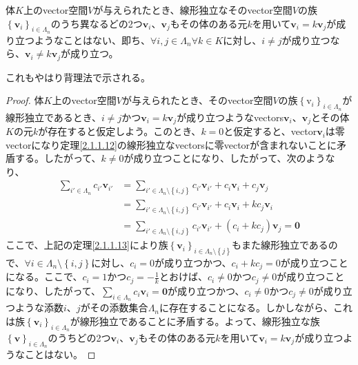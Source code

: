 \documentclass[dvipdfmx]{jsarticle}
\begin{document}
\begin{thm}\label{2.1.1.14}
体$K$上のvector空間$V$が与えられたとき、線形独立なそのvector空間$V$の族$\left\{ \mathbf{v}_i \right\}_{i\in \varLambda_n } $のうち異なるどの2つ$\mathbf{v}_{i}$、$\mathbf{v}_{j}$もその体のある元$k$を用いて$\mathbf{v}_{i} = k\mathbf{v}_{j}$が成り立つようなことはない、即ち、$\mathbf{\forall}i,j \in \varLambda_{n}\forall k \in K$に対し、$i \neq j$が成り立つなら、$\mathbf{v}_{i} \neq k\mathbf{v}_{j}$が成り立つ。
\end{thm}\par
これもやはり背理法で示される。
\begin{proof}
体$K$上のvector空間$V$が与えられたとき、そのvector空間$V$の族$\left\{ \mathrm{v}_i \right\}_{i\in \varLambda_n } $が線形独立であるとき、$i \neq j$かつ$\mathbf{v}_{i} = k\mathbf{v}_{j}$が成り立つようなvectors$\mathbf{v}_{i}$、$\mathbf{v}_{j}$とその体$K$の元$k$が存在すると仮定しよう。このとき、$k = 0$と仮定すると、vector$\mathbf{v}_{i}$は零vectorになり定理\ref{2.1.1.12}の線形独立なvectorsに零vectorが含まれないことに矛盾する。したがって、$k \neq 0$が成り立つことになり、したがって、次のようなり、
\begin{align*}
\sum_{i' \in \varLambda_{n}} {c_{i'}\mathbf{v}_{i'}} &= \sum_{i' \in \varLambda_{n} \setminus \left\{ i,j \right\}} {c_{i'}\mathbf{v}_{i'}} + c_{i}\mathbf{v}_{i} + c_{j}\mathbf{v}_{j}\\
&= \sum_{i' \in \varLambda_{n} \setminus \left\{ i,j \right\}} {c_{i'}\mathbf{v}_{i'}} + c_{i}\mathbf{v}_{i} + kc_{j}\mathbf{v}_{i}\\
&= \sum_{i' \in \varLambda_{n} \setminus \left\{ i,j \right\}} {c_{i'}\mathbf{v}_{i'}} + \left( c_{i} + kc_{j} \right)\mathbf{v}_{j} = \mathbf{0}
\end{align*}
ここで、上記の定理\ref{2.1.1.13}により族$\left\{ \mathbf{v}_i \right\}_{i \in \varLambda_{n} \setminus \left\{ j \right\} } $もまた線形独立であるので、$\forall i \in \varLambda_{n} \setminus \left\{ i,j \right\}$に対し、$c_{i} = 0$が成り立つかつ、$c_{i} + kc_{j} = 0$が成り立つことになる。ここで、$c_{i} = 1$かつ$c_{j} = - \frac{1}{k}$とおけば、$c_{i} \neq 0$かつ$c_{j} \neq 0$が成り立つことになり、したがって、$\sum_{i \in \varLambda_{n}} {c_{i}\mathbf{v}_{i}} = \mathbf{0}$が成り立つかつ、$c_{i} \neq 0$かつ$c_{j} \neq 0$が成り立つような添数$i$、$j$がその添数集合$\varLambda_{n}$に存在することになる。しかしながら、これは族$\left\{ \mathbf{v}_i \right\}_{i\in \varLambda_n } $が線形独立であることに矛盾する。よって、線形独立な族$\left\{ \mathbf{v} \right\}_{i\in \varLambda_n } $のうちどの2つ$\mathbf{v}_{i}$、$\mathbf{v}_{j}$もその体のある元$k$を用いて$\mathbf{v}_{i} = k\mathbf{v}_{j}$が成り立つようなことはない。
\end{proof}
\end{document}
